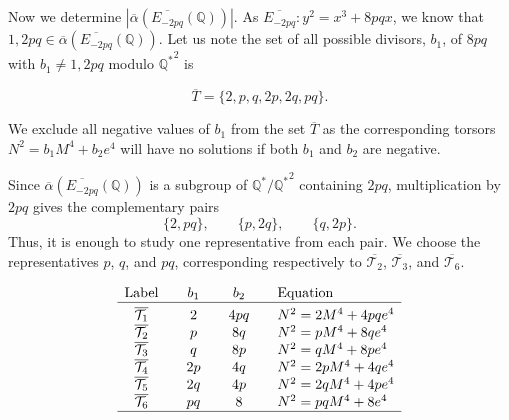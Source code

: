 \documentclass[12pt]{amsart}
\newcommand{\bbQ}{\mathbb{Q}}
\newcommand{\bbZ}{\mathbb{Z}}
\newcommand{\cT}{\mathcal{T}}
\numberwithin{equation}{section}
\theoremstyle{definition}
\begin{document}
\subsection{}

Now we determine $\left| \overline{\alpha} \left( \overline{E_{-2pq}}(\bbQ) \right) \right|$. As $\overline{E_{-2pq}}: y^{2}= x^{3} + 8pqx$, we know that $1, 2pq \in \overline{\alpha} \left( \overline{E_{-2pq}}(\bbQ) \right)$. Let us note the set of all possible divisors, $b_{1}$, of $8pq$ with $b_{1} \neq 1, 2pq$ modulo ${\bbQ^{*}}^{2}$ is

\[
\overline{T}=\{2,p,q,2p,2q,pq\}.
\]

We exclude all negative values of $b_{1}$ from the set $\overline{T}$
as the corresponding torsors $N^{2}= b_{1} M^{4} + b_{2} e^{4}$ will have no solutions
if both $b_{1}$ and $b_{2}$ are negative.


Since $\overline{\alpha}\left(\overline{E_{-2pq}}(\bbQ)\right)$ is a subgroup of
$\bbQ^{*}/{\bbQ^{*}}^{2}$ containing $2pq$, multiplication by $2pq$ gives the
complementary pairs
\[
\{2,pq\},\qquad \{p,2q\},\qquad \{q,2p\}.
\]
Thus, it is enough to study one representative from each pair. We choose the
representatives $p$, $q$, and $pq$, corresponding respectively to
$\overline{\cT_2}$, $\overline{\cT_3}$, and $\overline{\cT_6}$.



\begin{table}[h]
\centering
\[
\begin{array}{c@{\qquad}c@{\qquad}c@{\qquad}l}
\text{Label} & b_1 & b_2 & \text{Equation} \\
\hline
\noalign{\vskip 3pt}
\overline{\cT_1} & 2  & 4pq & N^2=2M^4+4pqe^4 \\
\overline{\cT_2} & p  & 8q  & N^2=pM^4+8qe^4 \\
\overline{\cT_3} & q  & 8p  & N^2=qM^4+8pe^4 \\
\overline{\cT_4} & 2p & 4q  & N^2=2pM^4+4qe^4 \\
\overline{\cT_5} & 2q & 4p  & N^2=2qM^4+4pe^4 \\
\overline{\cT_6} & pq & 8   & N^2=pqM^4+8e^4 \\
\hline
\end{array}
\]
\caption{Torsors for $\overline{E_{-2pq}}$.}
\label{table:oT-torsors}
\end{table}
\end{document}
